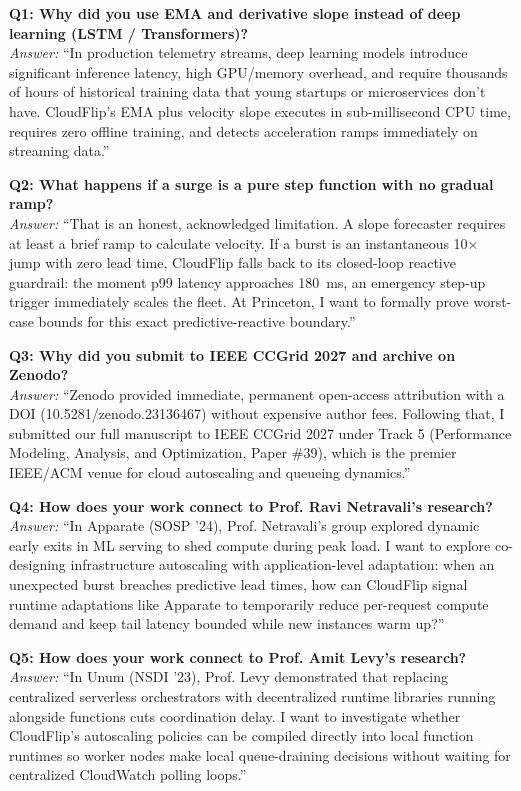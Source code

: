 \documentclass[11pt,letterpaper]{article}
\begin{document}
\textbf{Q1: Why did you use EMA and derivative slope instead of deep learning (LSTM / Transformers)?} \\
\textit{Answer:} ``In production telemetry streams, deep learning models introduce significant inference latency, high GPU/memory overhead, and require thousands of hours of historical training data that young startups or microservices don't have. CloudFlip's EMA plus velocity slope executes in sub-millisecond CPU time, requires zero offline training, and detects acceleration ramps immediately on streaming data.''

\textbf{Q2: What happens if a surge is a pure step function with no gradual ramp?} \\
\textit{Answer:} ``That is an honest, acknowledged limitation. A slope forecaster requires at least a brief ramp to calculate velocity. If a burst is an instantaneous 10$\times$ jump with zero lead time, CloudFlip falls back to its closed-loop reactive guardrail: the moment p99 latency approaches 180~ms, an emergency step-up trigger immediately scales the fleet. At Princeton, I want to formally prove worst-case bounds for this exact predictive-reactive boundary.''

\textbf{Q3: Why did you submit to IEEE CCGrid 2027 and archive on Zenodo?} \\
\textit{Answer:} ``Zenodo provided immediate, permanent open-access attribution with a DOI (10.5281/zenodo.23136467) without expensive author fees. Following that, I submitted our full manuscript to IEEE CCGrid 2027 under Track 5 (Performance Modeling, Analysis, and Optimization, Paper \#39), which is the premier IEEE/ACM venue for cloud autoscaling and queueing dynamics.''

\textbf{Q4: How does your work connect to Prof. Ravi Netravali's research?} \\
\textit{Answer:} ``In Apparate (SOSP '24), Prof. Netravali's group explored dynamic early exits in ML serving to shed compute during peak load. I want to explore co-designing infrastructure autoscaling with application-level adaptation: when an unexpected burst breaches predictive lead times, how can CloudFlip signal runtime adaptations like Apparate to temporarily reduce per-request compute demand and keep tail latency bounded while new instances warm up?''

\textbf{Q5: How does your work connect to Prof. Amit Levy's research?} \\
\textit{Answer:} ``In Unum (NSDI '23), Prof. Levy demonstrated that replacing centralized serverless orchestrators with decentralized runtime libraries running alongside functions cuts coordination delay. I want to investigate whether CloudFlip's autoscaling policies can be compiled directly into local function runtimes so worker nodes make local queue-draining decisions without waiting for centralized CloudWatch polling loops.''
\end{document}
